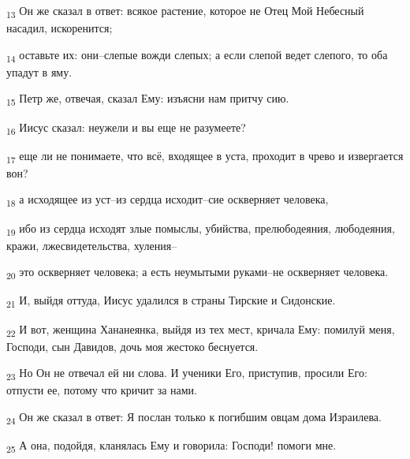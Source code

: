 \begin{tcolorbox}
\textsubscript{13} Он же сказал в ответ: всякое растение, которое не Отец Мой Небесный насадил, искоренится;
\end{tcolorbox}
\begin{tcolorbox}
\textsubscript{14} оставьте их: они--слепые вожди слепых; а если слепой ведет слепого, то оба упадут в яму.
\end{tcolorbox}
\begin{tcolorbox}
\textsubscript{15} Петр же, отвечая, сказал Ему: изъясни нам притчу сию.
\end{tcolorbox}
\begin{tcolorbox}
\textsubscript{16} Иисус сказал: неужели и вы еще не разумеете?
\end{tcolorbox}
\begin{tcolorbox}
\textsubscript{17} еще ли не понимаете, что всё, входящее в уста, проходит в чрево и извергается вон?
\end{tcolorbox}
\begin{tcolorbox}
\textsubscript{18} а исходящее из уст--из сердца исходит--сие оскверняет человека,
\end{tcolorbox}
\begin{tcolorbox}
\textsubscript{19} ибо из сердца исходят злые помыслы, убийства, прелюбодеяния, любодеяния, кражи, лжесвидетельства, хуления--
\end{tcolorbox}
\begin{tcolorbox}
\textsubscript{20} это оскверняет человека; а есть неумытыми руками--не оскверняет человека.
\end{tcolorbox}
\begin{tcolorbox}
\textsubscript{21} И, выйдя оттуда, Иисус удалился в страны Тирские и Сидонские.
\end{tcolorbox}
\begin{tcolorbox}
\textsubscript{22} И вот, женщина Хананеянка, выйдя из тех мест, кричала Ему: помилуй меня, Господи, сын Давидов, дочь моя жестоко беснуется.
\end{tcolorbox}
\begin{tcolorbox}
\textsubscript{23} Но Он не отвечал ей ни слова. И ученики Его, приступив, просили Его: отпусти ее, потому что кричит за нами.
\end{tcolorbox}
\begin{tcolorbox}
\textsubscript{24} Он же сказал в ответ: Я послан только к погибшим овцам дома Израилева.
\end{tcolorbox}
\begin{tcolorbox}
\textsubscript{25} А она, подойдя, кланялась Ему и говорила: Господи! помоги мне.
\end{tcolorbox}

